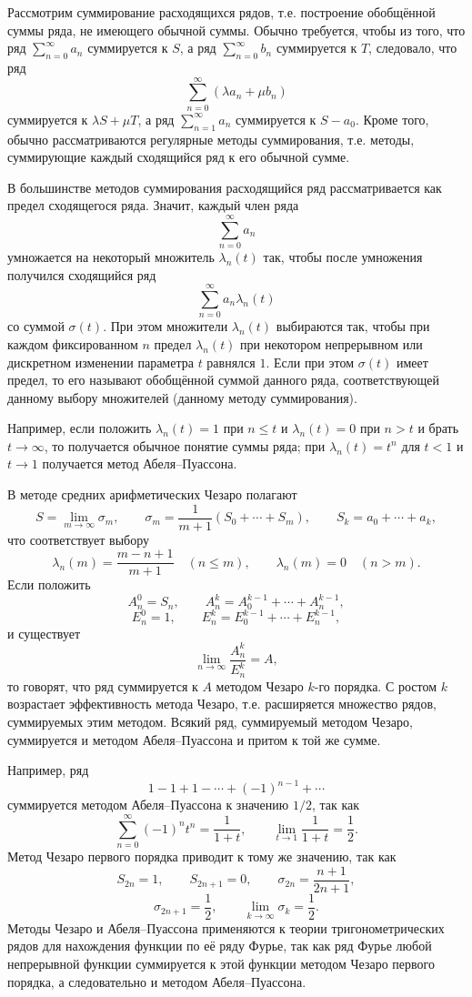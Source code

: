 \begin{rusblock}
Рассмотрим суммирование расходящихся рядов, т.е. построение обобщённой суммы ряда, не имеющего обычной суммы. Обычно требуется, чтобы из того, что ряд $\sum_{n=0}^{\infty}a_n$ суммируется к $S$, а ряд $\sum_{n=0}^{\infty}b_n$ суммируется к $T$, следовало, что ряд
\[
\sum_{n=0}^{\infty}(\lambda a_n+\mu b_n)
\]
суммируется к $\lambda S+\mu T$, а ряд $\sum_{n=1}^{\infty}a_n$ суммируется к $S-a_0$. Кроме того, обычно рассматриваются регулярные методы суммирования, т.е. методы, суммирующие каждый сходящийся ряд к его обычной сумме.

В большинстве методов суммирования расходящийся ряд рассматривается как предел сходящегося ряда. Значит, каждый член ряда
\[
\tag{1}\sum_{n=0}^{\infty}a_n
\]
умножается на некоторый множитель $\lambda_n(t)$ так, чтобы после умножения получился сходящийся ряд
\[
\tag{2}\sum_{n=0}^{\infty}a_n\lambda_n(t)
\]
со суммой $\sigma(t)$. При этом множители $\lambda_n(t)$ выбираются так, чтобы при каждом фиксированном $n$ предел $\lambda_n(t)$ при некотором непрерывном или дискретном изменении параметра $t$ равнялся $1$. Если при этом $\sigma(t)$ имеет предел, то его называют обобщённой суммой данного ряда, соответствующей данному выбору множителей (данному методу суммирования).

Например, если положить $\lambda_n(t)=1$ при $n\le t$ и $\lambda_n(t)=0$ при $n>t$ и брать $t\to\infty$, то получается обычное понятие суммы ряда; при $\lambda_n(t)=t^n$ для $t<1$ и $t\to1$ получается метод Абеля--Пуассона.

В методе средних арифметических Чезаро полагают
\[
S=\lim_{m\to\infty}\sigma_m,
\qquad
\sigma_m=\frac{1}{m+1}(S_0+\cdots+S_m),
\qquad
S_k=a_0+\cdots+a_k,
\]
что соответствует выбору
\[
\lambda_n(m)=\frac{m-n+1}{m+1}\quad (n\le m),\qquad \lambda_n(m)=0\quad(n>m).
\]
Если положить
\[
A_n^0=S_n,\qquad A_n^k=A_0^{k-1}+\cdots+A_n^{k-1},
\]
\[
E_n^0=1,\qquad E_n^k=E_0^{k-1}+\cdots+E_n^{k-1},
\]
и существует
\[
\lim_{n\to\infty}\frac{A_n^k}{E_n^k}=A,
\]
то говорят, что ряд суммируется к $A$ методом Чезаро $k$-го порядка. С ростом $k$ возрастает эффективность метода Чезаро, т.е. расширяется множество рядов, суммируемых этим методом. Всякий ряд, суммируемый методом Чезаро, суммируется и методом Абеля--Пуассона и притом к той же сумме.

Например, ряд
\[
1-1+1-\cdots+(-1)^{n-1}+\cdots
\]
суммируется методом Абеля--Пуассона к значению $1/2$, так как
\[
\sum_{n=0}^{\infty}(-1)^nt^n=\frac{1}{1+t},\qquad
\lim_{t\to1}\frac{1}{1+t}=\frac12.
\]
Метод Чезаро первого порядка приводит к тому же значению, так как
\[
S_{2n}=1,\qquad S_{2n+1}=0,\qquad \sigma_{2n}=\frac{n+1}{2n+1},
\]
\[
\sigma_{2n+1}=\frac12,\qquad \lim_{k\to\infty}\sigma_k=\frac12.
\]
Методы Чезаро и Абеля--Пуассона применяются к теории тригонометрических рядов для нахождения функции по её ряду Фурье, так как ряд Фурье любой непрерывной функции суммируется к этой функции методом Чезаро первого порядка, а следовательно и методом Абеля--Пуассона.
\end{rusblock}
